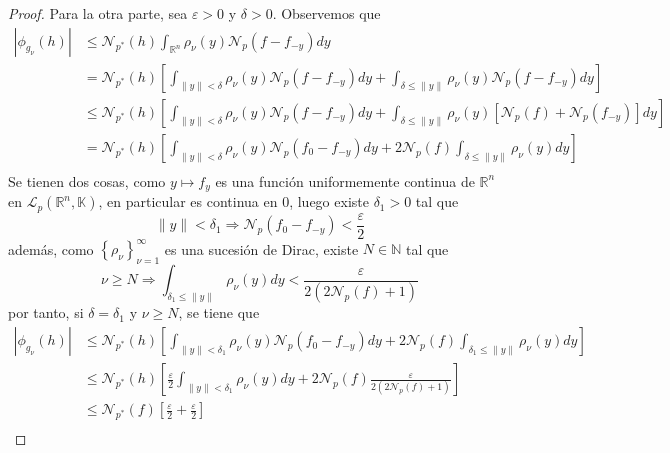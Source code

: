 \documentclass[12pt]{report}
\newcounter{it}
\theoremstyle{largebreak}
\newcommand\abs[1]{\ensuremath{\left|#1\right|}}
\newcommand{\N}[2]{\ensuremath{\mathcal{N}_{#1}\left(#2\right)}}
\newcommand{\norm}[1]{\ensuremath{\|#1\|}}
\begin{document}
\begin{proof}
        Para la otra parte, sea $\varepsilon>0$ y $\delta>0$. Observemos que
        \begin{equation*}
            \begin{split}
                \abs{\phi_{ g_\nu}(h)}&\leq\N{p^*}{h}\int_{\mathbb{R}^n}\rho_\nu(y)\N{p}{f-f_{-y}}dy\\
                &=\N{p^*}{h}\left[\int_{\norm{y}<\delta}\rho_\nu(y)\N{p}{f-f_{-y}}dy+\int_{\delta\leq\norm{y}}\rho_\nu(y)\N{p}{f-f_{-y}}dy\right]\\
                &\leq\N{p^*}{h}\left[\int_{\norm{y}<\delta}\rho_\nu(y)\N{p}{f-f_{-y}}dy+\int_{\delta\leq\norm{y}}\rho_\nu(y)\left[\N{p}{f}+\N{p}{f_{-y}}\right]dy\right]\\
                &=\N{p^*}{h}\left[\int_{\norm{y}<\delta}\rho_\nu(y)\N{p}{f_0-f_{-y}}dy+2\N{p}{f}\int_{\delta\leq\norm{y}}\rho_\nu(y)dy\right]\\
            \end{split}
        \end{equation*}
        Se tienen dos cosas, como $y\mapsto f_y$ es una función uniformemente continua de $\mathbb{R}^n$ en $\mathcal{L}_p(\mathbb{R}^n,\mathbb{K})$, en particular es continua en $0$, luego existe $\delta_1>0$ tal que
        \begin{equation*}
            \norm{y}<\delta_1\Rightarrow \N{p}{f_0-f_{-y}}<\frac{\varepsilon}{2}
        \end{equation*}
        además, como $\left\{\rho_\nu \right\}_{ \nu=1}^\infty$ es una sucesión de Dirac, existe $N\in\mathbb{N}$ tal que
        \begin{equation*}
            \nu\geq N\Rightarrow\int_{\delta_1\leq\norm{y}}\rho_\nu(y)dy<\frac{\varepsilon}{2\left(2\N{p}{f}+1 \right)}
        \end{equation*}
        por tanto, si $\delta=\delta_1$ y $\nu\geq N$, se tiene que
        \begin{equation*}
            \begin{split}
                \abs{\phi_{ g_\nu}(h)}&\leq\N{p^*}{h}\left[\int_{\norm{y}<\delta_1}\rho_\nu(y)\N{p}{f_0-f_{-y}}dy+2\N{p}{f}\int_{\delta_1\leq\norm{y}}\rho_\nu(y)dy\right]\\
                &\leq\N{p^*}{h}\left[\frac{\varepsilon}{2}\int_{\norm{y}<\delta_1}\rho_\nu(y)dy+2\N{p}{f}\frac{\varepsilon}{2\left(2\N{p}{f}+1 \right)}\right]\\
                &\leq\N{p^*}{f}\left[\frac{\varepsilon}{2}+\frac{\varepsilon}{2}\right]\\

\end{split}
\end{equation*}
\end{proof}
\end{document}
